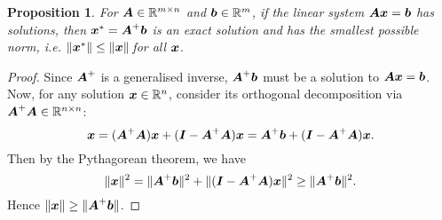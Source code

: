 \documentclass[12pt]{article}
\newtheorem{prop}{Proposition}[section]
\begin{document}
	\begin{prop}
		For $\bmA\in\RR^{m\times n}$ and $\bmb\in\RR^m$, if the linear system $\boldsymbol{A}\boldsymbol{x}=\boldsymbol{b}$ has solutions, then $\boldsymbol{x}^*=\boldsymbol{A}^+\boldsymbol{b}$ is an exact solution and has the smallest possible norm, i.e. $\|\boldsymbol{x}^*\|\leq\|\boldsymbol{x}\|\, $for all $\boldsymbol{x}$.
	\end{prop}
	\begin{proof}
		Since $\boldsymbol{A}^+$ is a generalised inverse, $\boldsymbol{A}^+\boldsymbol{b}$ must be a solution to $\boldsymbol{A}\boldsymbol{x}=\boldsymbol{b}$. Now, for any solution $\bmx\in\Rn$, consider its orthogonal decomposition via $\bmA^+\bmA\in\RR^{n\times n}$:
		$$\boldsymbol{x}=(\boldsymbol{A}^+\boldsymbol{A})\boldsymbol{x}+(\boldsymbol{I}-\boldsymbol{A}^+\boldsymbol{A})\boldsymbol{x}=\boldsymbol{A}^+\boldsymbol{b}+(\boldsymbol{I}-\boldsymbol{A}^+\boldsymbol{A})\boldsymbol{x}.$$
		Then by the Pythagorean theorem, we have
		$$\|\boldsymbol{x}\|^2=\|\boldsymbol{A}^+\boldsymbol{b}\|^2+\|(\boldsymbol{I}-\boldsymbol{A}^+\boldsymbol{A})\boldsymbol{x}\|^2\geq \|\boldsymbol{A}^+\boldsymbol{b}\|^2.$$
		Hence $\|\boldsymbol{x}\|\geq\|\boldsymbol{A}^+\boldsymbol{b}\|$.
	\end{proof}
	\pagebreak
\end{document}

